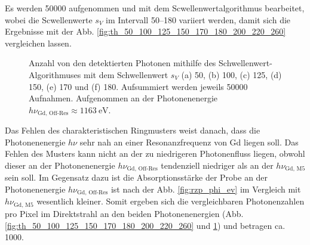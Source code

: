 \noindent
Es werden \SI{50000}{\captures} aufgenommen und mit dem Scwellenwertalgorithmus bearbeitet, wobei die Scwellenwerte $s_V$ im Intervall \SIrange{50}{180}{\adu} variiert werden, damit sich die Ergebnisse mit der Abb. \ref{fig:th_50_100_125_150_170_180_200_220_260} vergleichen lassen.
\begin{figure}[H]
    \centering
    
    \caption{Anzahl von den detektierten Photonen mithilfe des Schwellenwert-Algorithmuses mit dem Schwellenwert $s_V$ (a) \SI{50}{\adu}, (b) \SI{100}{\adu}, (c) \SI{125}{\adu}, (d) \SI{150}{\adu}, (e) \SI{170}{\adu} und (f) \SI{180}{\adu}. Aufsummiert werden jeweils \num{50000} Aufnahmen. Aufgenommen an der Photonenenergie $h\nu_\text{Gd, Off-Res} \approx \SI{1163}{\eV}$.}
    \label{fig:th_50_100_125_150_170_180_off_resonance}
\end{figure}
\noindent
Das Fehlen des charakteristischen Ringmusters weist danach, dass die Photonenenergie $h\nu$ sehr nah an einer Resonanzfrequenz von Gd liegen soll. Das Fehlen des Musters kann nicht an der zu niedrigeren Photonenfluss liegen, obwohl dieser an der Photonenenergie $h\nu_{\text{Gd, Off-Res}}$ tendenziell niedriger als an der $h\nu_{\text{Gd, M5}}$ sein soll. Im Gegensatz dazu ist die Absorptionsstärke der Probe an der Photonenenergie $h\nu_{\text{Gd, Off-Res}}$ ist nach der Abb. \ref{fig:rzp_phi_ev} im Vergleich mit $h\nu_{\text{Gd, M5}}$ wesentlich kleiner. Somit ergeben sich die vergleichbaren Photonenzahlen pro Pixel im Direktstrahl an den beiden Photonenenergien (Abb. \ref{fig:th_50_100_125_150_170_180_200_220_260} und \ref{fig:th_50_100_125_150_170_180_off_resonance}) und betragen ca. \SI{1000}{\photons}.

